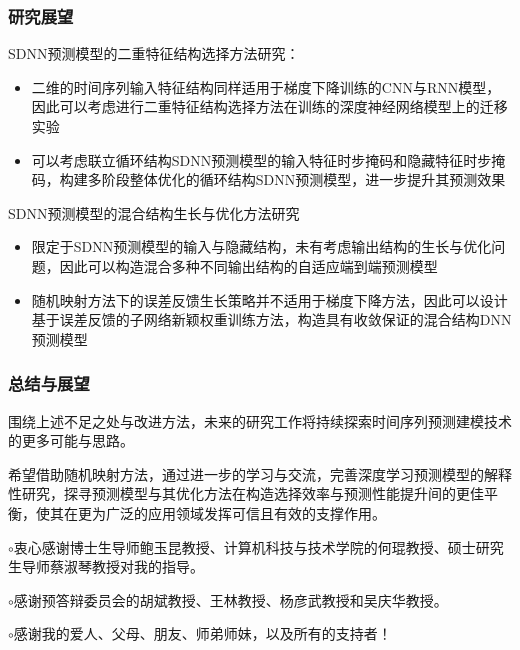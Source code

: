 \begin{frame}
    \frametitle{研究展望}
         
    SDNN预测模型的二重特征结构选择方法研究：
    \begin{itemize}
        \item 二维的时间序列输入特征结构同样适用于梯度下降训练的CNN与RNN模型，因此可以考虑进行二重特征结构选择方法在训练的深度神经网络模型上的迁移实验
        \item 可以考虑联立循环结构SDNN预测模型的输入特征时步掩码和隐藏特征时步掩码，构建多阶段整体优化的循环结构SDNN预测模型，进一步提升其预测效果
    \end{itemize}

    SDNN预测模型的混合结构生长与优化方法研究
    \begin{itemize}
        \item 限定于SDNN预测模型的输入与隐藏结构，未有考虑输出结构的生长与优化问题，因此可以构造混合多种不同输出结构的自适应端到端预测模型
        \item 随机映射方法下的误差反馈生长策略并不适用于梯度下降方法，因此可以设计基于误差反馈的子网络新颖权重训练方法，构造具有收敛保证的混合结构DNN预测模型
    \end{itemize}

\end{frame}




\begin{frame}
    \frametitle{总结与展望}

    围绕上述不足之处与改进方法，未来的研究工作将持续探索时间序列预测建模技术的更多可能与思路。
    
    希望借助随机映射方法，通过进一步的学习与交流，完善深度学习预测模型的解释性研究，探寻预测模型与其优化方法在构造选择效率与预测性能提升间的更佳平衡，使其在更为广泛的应用领域发挥可信且有效的支撑作用。


    \vspace*{1em}
    \(\circ\)衷心感谢博士生导师鲍玉昆教授、计算机科技与技术学院的何琨教授、硕士研究生导师蔡淑琴教授对我的指导。

    \(\circ\)感谢预答辩委员会的胡斌教授、王林教授、杨彦武教授和吴庆华教授。
    
    \(\circ\)感谢我的爱人、父母、朋友、师弟师妹，以及所有的支持者！

\end{frame}
